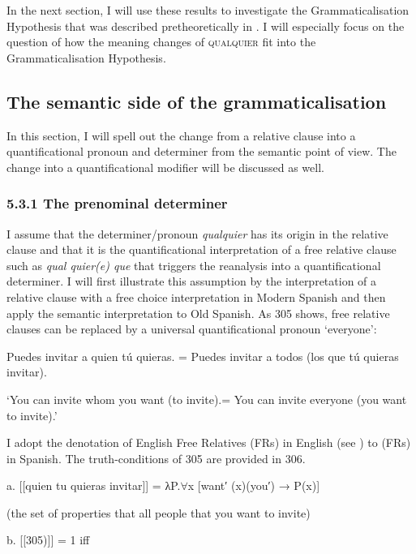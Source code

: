 \documentclass[output=paper]{langscibook}
\begin{document}
  In the next section, I will use these results to investigate the Grammaticalisation Hypothesis that was described pretheoretically in . I will especially focus on the question of how the meaning changes of \textsc{qualquier} fit into the Grammaticalisation Hypothesis.

\subsection{The semantic side of the grammaticalisation}

In this section, I will spell out the change from a relative clause into a quantificational pronoun and determiner from the semantic point of view. The change into a quantificational modifier will be discussed as well.

\subsubsection{\textbf{5.3.1} \textbf{The} \textbf{prenominal} \textbf{determiner}}

  I assume that the determiner/pronoun \textit{qualquier} has its origin in the relative clause and that it is the quantificational interpretation of a free relative clause such as \textit{qual quier(e) que} that triggers the reanalysis into a quantificational determiner. I will first illustrate this assumption by the interpretation of a relative clause with a free choice interpretation in Modern Spanish and then apply the semantic interpretation to Old Spanish. As 305 shows, free relative clauses can be replaced by a universal quantificational pronoun ‘everyone’:

  Puedes invitar a quien tú quieras. = Puedes invitar a todos (los que tú quieras invitar).

    ‘You can invite whom you want (to invite).= You can invite everyone (you want to invite).’

I adopt the denotation of English Free Relatives (FRs) in English (see \citealt{Šimík2018}) to (FRs) in Spanish. The truth-conditions of 305 are provided in 306.

\begin{styleAuthor}
  a.  [[quien tu quieras invitar]] = λP.${\forall}$x [want′ (x)(you′) → P(x)]
\end{styleAuthor}

(the set of properties that all people that you want to invite)

  b.  [[305)]] = 1 iff
\end{document}
